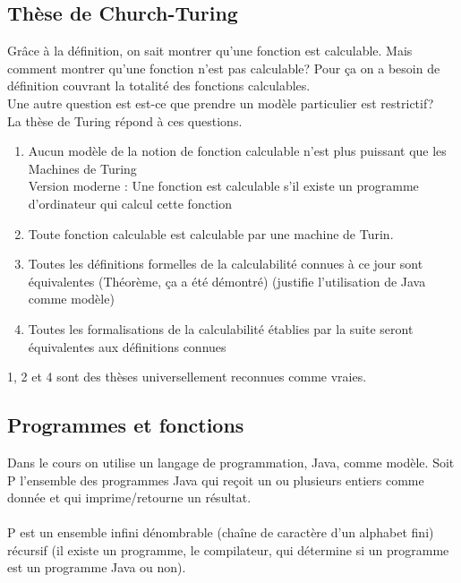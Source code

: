 \documentclass[11pt,a4paper]{article}
\begin{document}

\subsection{Thèse de Church-Turing}
\label{sub:th_se_de_church_turing}
Grâce à la définition, on sait montrer qu'une fonction est calculable. Mais comment
montrer qu'une fonction n'est pas calculable? Pour ça on a besoin de définition
couvrant la totalité des fonctions calculables. \\
Une autre question est est-ce que prendre un modèle particulier est restrictif?\\
La thèse de Turing répond à ces questions.
\begin{enumerate}
	\item Aucun modèle de la notion de fonction calculable n'est plus puissant
		que les Machines de Turing \\
		Version moderne : Une fonction est calculable s'il existe un 
		programme d'ordinateur qui calcul cette fonction
	\item Toute fonction calculable est calculable par une machine de Turin.
	\item Toutes les définitions formelles de la calculabilité connues à ce 
		jour sont équivalentes (Théorème, ça a été démontré) (justifie 
		l'utilisation de Java comme modèle)
	\item Toutes les formalisations de la calculabilité établies par la 
		suite seront équivalentes aux définitions connues
\end{enumerate}
1, 2 et 4 sont des thèses universellement reconnues comme vraies.


\subsection{Programmes et fonctions}
\label{sub:programmes_et_fonctions}
Dans le cours on utilise un langage de programmation, Java, comme modèle.
Soit P l'ensemble des programmes Java qui reçoit un ou plusieurs entiers comme 
donnée et qui imprime/retourne un résultat.

\paragraph{} P est un ensemble infini dénombrable (chaîne de caractère d'un 
alphabet fini) récursif (il existe un programme, le compilateur, qui détermine 
si un programme est un programme Java ou non).
\end{document}
